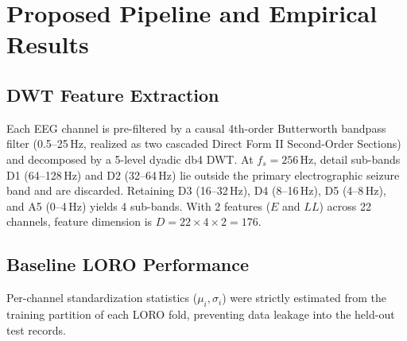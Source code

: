 \documentclass[10pt,twocolumn,letterpaper]{article}
\begin{document}
\section{Proposed Pipeline and Empirical Results}
\label{sec:proposed_results}

\subsection{DWT Feature Extraction}

Each EEG channel is pre-filtered by a causal 4th-order Butterworth bandpass filter (0.5--25\,Hz, realized as two cascaded Direct Form II Second-Order Sections) and decomposed by a 5-level dyadic db4 DWT. At $f_s = 256$\,Hz, detail sub-bands D1 (64--128\,Hz) and D2 (32--64\,Hz) lie outside the primary electrographic seizure band and are discarded. Retaining D3 (16--32\,Hz), D4 (8--16\,Hz), D5 (4--8\,Hz), and A5 (0--4\,Hz) yields 4 sub-bands. With 2 features ($E$ and $LL$) across 22 channels, feature dimension is $D = 22 \times 4 \times 2 = 176$.

\subsection{Baseline LORO Performance}

Per-channel standardization statistics ($\mu_i, \sigma_i$) were strictly estimated from the training partition of each LORO fold, preventing data leakage into the held-out test records.

\begin{table}[t]
\centering
\footnotesize
\caption{Per-subject performance of proposed DWT + Linear SVM pipeline ($k=3$).}
\label{tab:baseline_results}
\end{table}
\end{document}
